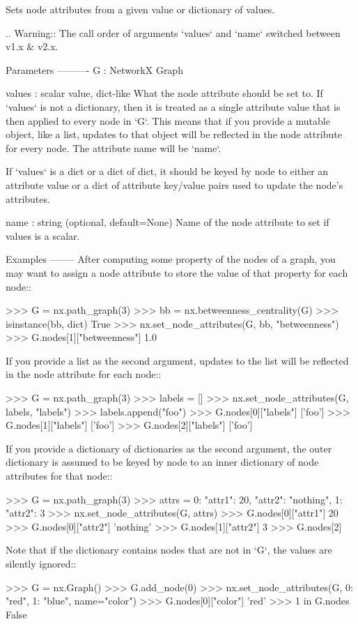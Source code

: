 \begin{DoxyVerb}Sets node attributes from a given value or dictionary of values.

.. Warning:: The call order of arguments `values` and `name`
    switched between v1.x & v2.x.

Parameters
----------
G : NetworkX Graph

values : scalar value, dict-like
    What the node attribute should be set to.  If `values` is
    not a dictionary, then it is treated as a single attribute value
    that is then applied to every node in `G`.  This means that if
    you provide a mutable object, like a list, updates to that object
    will be reflected in the node attribute for every node.
    The attribute name will be `name`.

    If `values` is a dict or a dict of dict, it should be keyed
    by node to either an attribute value or a dict of attribute key/value
    pairs used to update the node's attributes.

name : string (optional, default=None)
    Name of the node attribute to set if values is a scalar.

Examples
--------
After computing some property of the nodes of a graph, you may want
to assign a node attribute to store the value of that property for
each node::

    >>> G = nx.path_graph(3)
    >>> bb = nx.betweenness_centrality(G)
    >>> isinstance(bb, dict)
    True
    >>> nx.set_node_attributes(G, bb, "betweenness")
    >>> G.nodes[1]["betweenness"]
    1.0

If you provide a list as the second argument, updates to the list
will be reflected in the node attribute for each node::

    >>> G = nx.path_graph(3)
    >>> labels = []
    >>> nx.set_node_attributes(G, labels, "labels")
    >>> labels.append("foo")
    >>> G.nodes[0]["labels"]
    ['foo']
    >>> G.nodes[1]["labels"]
    ['foo']
    >>> G.nodes[2]["labels"]
    ['foo']

If you provide a dictionary of dictionaries as the second argument,
the outer dictionary is assumed to be keyed by node to an inner
dictionary of node attributes for that node::

    >>> G = nx.path_graph(3)
    >>> attrs = {0: {"attr1": 20, "attr2": "nothing"}, 1: {"attr2": 3}}
    >>> nx.set_node_attributes(G, attrs)
    >>> G.nodes[0]["attr1"]
    20
    >>> G.nodes[0]["attr2"]
    'nothing'
    >>> G.nodes[1]["attr2"]
    3
    >>> G.nodes[2]
    {}

Note that if the dictionary contains nodes that are not in `G`, the
values are silently ignored::

    >>> G = nx.Graph()
    >>> G.add_node(0)
    >>> nx.set_node_attributes(G, {0: "red", 1: "blue"}, name="color")
    >>> G.nodes[0]["color"]
    'red'
    >>> 1 in G.nodes
    False\end{DoxyVerb}
 \mbox{\label{namespacenetworkx_1_1classes_1_1function_acfa7d5122eef21ede5dee1c2f8521ee5}} 
